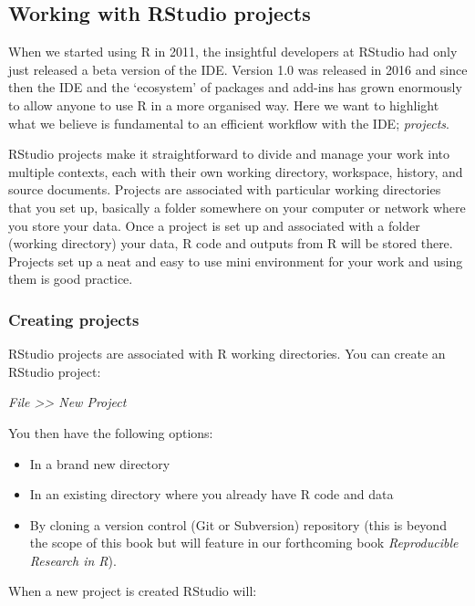 \documentclass[
]{book}
\providecommand{\tightlist}{%
  \setlength{\itemsep}{0pt}\setlength{\parskip}{0pt}}
\begin{document}
\hypertarget{RS-projects}{%
\subsection{Working with RStudio projects}\label{RS-projects}}

When we started using R in 2011, the insightful developers at RStudio
had only just released a beta version of the IDE. Version 1.0 was
released in 2016 and since then the IDE and the `ecosystem' of packages
and add-ins has grown enormously to allow anyone to use R in a more
organised way. Here we want to highlight what we believe is fundamental
to an efficient workflow with the IDE; \emph{projects}.

RStudio projects make it straightforward to divide and manage your work
into multiple contexts, each with their own working directory,
workspace, history, and source documents. Projects are associated with
particular working directories that you set up, basically a folder
somewhere on your computer or network where you store your data. Once a
project is set up and associated with a folder (working directory) your
data, R code and outputs from R will be stored there. Projects set up a
neat and easy to use mini environment for your work and using them is
good practice.

\hypertarget{create-proj}{%
\subsubsection{Creating projects}\label{create-proj}}

RStudio projects are associated with R working directories. You can
create an RStudio project:

\emph{File \textgreater\textgreater{} New Project}

You then have the following options:

\begin{itemize}
\tightlist
\item
  In a brand new directory
\item
  In an existing directory where you already have R code and data
\item
  By cloning a version control (Git or Subversion) repository (this is
  beyond the scope of this book but will feature in our forthcoming book
  \emph{Reproducible Research in R}).
\end{itemize}

When a new project is created RStudio will:
\end{document}
